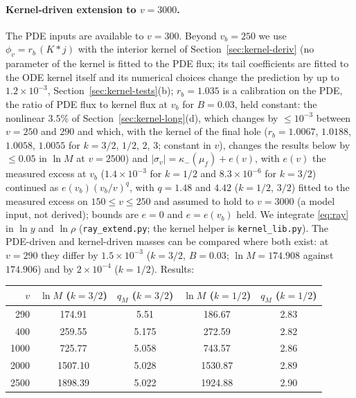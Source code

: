 \documentclass[11pt]{article}
\begin{document}
\paragraph{Kernel-driven extension to $v=3000$.} The PDE inputs are available to $v=300$. Beyond $v_b=250$ we use $\phi_v=r_b\,(K*j)$ with the interior kernel of Section~\ref{sec:kernel-deriv} (no parameter of the kernel is fitted to the PDE flux; its tail coefficients are fitted to the ODE kernel itself and its numerical choices change the prediction by up to $1.2\times10^{-3}$, Section~\ref{sec:kernel-tests}(b); $r_b=1.035$ is a calibration on the PDE, the ratio of PDE flux to kernel flux at $v_b$ for $B=0.03$, held constant: the nonlinear $3.5\%$ of Section~\ref{sec:kernel-long}(d), which changes by $\le10^{-3}$ between $v=250$ and $290$ and which, with the kernel of the final hole ($r_b=1.0067$, $1.0188$, $1.0058$, $1.0055$ for $k=3/2$, $1/2$, $2$, $3$; constant in $v$), changes the results below by $\le0.05$ in $\ln M$ at $v=2500$) and $|\sigma_v|=\kappa_-(\mu_f)+e(v)$, with $e(v)$ the measured excess at $v_b$ ($1.4\times10^{-3}$ for $k=1/2$ and $8.3\times10^{-6}$ for $k=3/2$) continued as $e(v_b)(v_b/v)^{q}$, with $q=1.48$ and $4.42$ ($k=1/2$, $3/2$) fitted to the measured excess on $150\le v\le250$ and assumed to hold to $v=3000$ (a model input, not derived); bounds are $e=0$ and $e=e(v_b)$ held. We integrate \eqref{eq:ray} in $\ln y$ and $\ln\rho$ (\texttt{ray\_extend.py}; the kernel helper is \texttt{kernel\_lib.py}). The PDE-driven and kernel-driven masses can be compared where both exist: at $v=290$ they differ by $1.5\times10^{-3}$ ($k=3/2$, $B=0.03$; $\ln M=174.908$ against $174.906$) and by $2\times10^{-4}$ ($k=1/2$). Results:
\begin{center}\small
\begin{tabular}{rcccc}
\toprule
$v$ & $\ln M$ ($k=3/2$) & $q_M$ ($k=3/2$) & $\ln M$ ($k=1/2$) & $q_M$ ($k=1/2$)\\
\midrule
290 & 174.91 & 5.51 & 186.67 & 2.83\\
400 & 259.55 & 5.175 & 272.59 & 2.82\\
1000 & 725.77 & 5.058 & 743.57 & 2.86\\
2000 & 1507.10 & 5.028 & 1530.87 & 2.89\\
2500 & 1898.39 & 5.022 & 1924.88 & 2.90\\
\bottomrule
\end{tabular}
\end{center}
\end{document}

